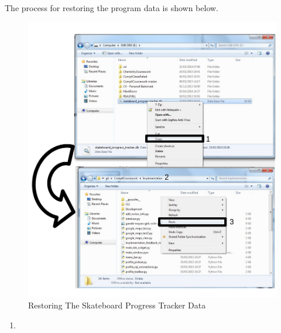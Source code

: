 The process for restoring the program data is shown below.

\begin{figure}[H]
    \includegraphics[width=\textwidth]{./Manual/Images/RestoringData.pdf}
    \caption{Restoring The Skateboard Progress Tracker Data} \label{fig:Restoring Data}
\end{figure}

\begin{enumerate}
\item
\end{enumerate}